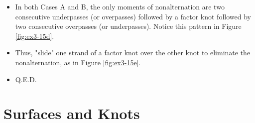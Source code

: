\documentclass[titlepage]{article}
\numberwithin{figure}{section}
\numberwithin{table}{section}
\numberwithin{equation}{section}
\begin{document}
\begin{itemize}
\begin{itemize}
\begin{itemize}
        \end{itemize}
        \item In both Cases A and B, the only moments of nonalternation are two consecutive underpasses (or overpasses) followed by a factor knot followed by two consecutive overpasses (or underpasses). Notice this pattern in Figure \ref{fig:ex3-15d}.
        \item Thus, "slide" one strand of a factor knot over the other knot to eliminate the nonalternation, as in Figure \ref{fig:ex3-15e}.
        \item Q.E.D.
    \end{itemize}
\end{itemize}
\newpage



\section{Surfaces and Knots}
\end{document}
